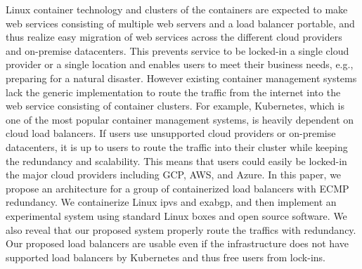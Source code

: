 \begin{summary}

Linux container technology and clusters of the containers are expected to make web services consisting of multiple web servers and a load balancer portable, and thus realize easy migration of web services across the different cloud providers and on-premise datacenters.
This prevents service to be locked-in a single cloud provider or a single location and enables users to meet their business needs, e.g., preparing for a natural disaster.
However existing container management systems lack the generic implementation to route the traffic from the internet into the web service consisting of container clusters.
For example, Kubernetes, which is one of the most popular container management systems, is heavily dependent on cloud load balancers. If users use unsupported cloud providers or on-premise datacenters, it is up to users to route the traffic into their cluster while keeping the redundancy and scalability.
This means that users could easily be locked-in the major cloud providers including GCP, AWS, and Azure.
In this paper, we propose an architecture for a group of containerized load balancers with ECMP redundancy.
We containerize Linux ipvs and exabgp, and then implement an experimental system using standard Linux boxes and open source software.
We also reveal that our proposed system properly route the traffics with redundancy.
Our proposed load balancers are usable even if the infrastructure does not have supported load balancers by Kubernetes and thus free users from lock-ins.

\end{summary}
